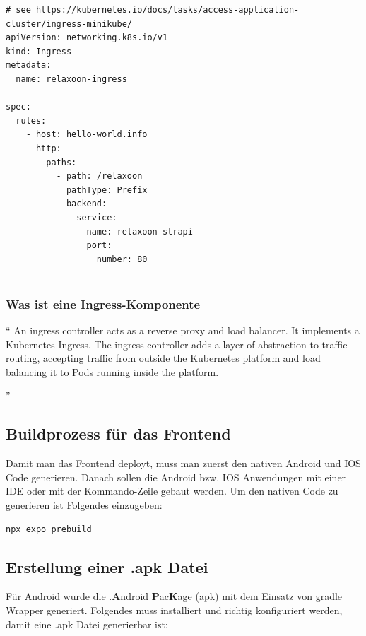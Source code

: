\begin{lstlisting}[caption=ingress-contrller]
  # see https://kubernetes.io/docs/tasks/access-application-cluster/ingress-minikube/
apiVersion: networking.k8s.io/v1
kind: Ingress
metadata:
  name: relaxoon-ingress

spec:
  rules:
    - host: hello-world.info
      http:
        paths:
          - path: /relaxoon
            pathType: Prefix
            backend:
              service:
                name: relaxoon-strapi
                port:
                  number: 80
  
\end{lstlisting}




\subsubsection{Was ist eine Ingress-Komponente}
``
An ingress controller acts as a reverse proxy and load balancer.
It implements a Kubernetes Ingress.
The ingress controller adds a layer of abstraction to traffic routing,
accepting traffic from outside the Kubernetes platform and load balancing
it to Pods running inside the platform.

''
\cite{ingress}

\subsection{Buildprozess für das Frontend}

Damit man das Frontend deployt, muss man zuerst den nativen Android und IOS Code generieren.
Danach sollen die Android bzw. IOS Anwendungen mit einer IDE oder mit der Kommando-Zeile gebaut werden.
Um den nativen Code zu generieren ist Folgendes einzugeben:
\begin{lstlisting}[language=Bash,caption=generate android and IOS]
npx expo prebuild
\end{lstlisting}





\subsection{Erstellung einer .apk Datei}
Für Android wurde die .\textbf{A}ndroid \textbf{P}ac\textbf{K}age (apk)  mit dem Einsatz von gradle Wrapper generiert.
Folgendes muss installiert und richtig konfiguriert werden, damit  eine .apk Datei generierbar ist:



